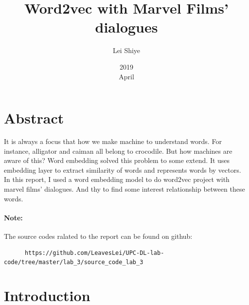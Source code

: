 \documentclass[a4paper,10pt]{article}
\begin{document}
%
   \title{Word2vec with Marvel Films' dialogues}

   \author{Lei Shiye}
          
   \date{2019\\ April}

   \maketitle
 
  \newpage
    
\section*{Abstract}
It is always a focus that how we make machine to understand words. For instance, alligator and caiman all belong to crocodile. But how machines are aware of this? Word embedding solved this problem to some extend. It uses embedding layer to extract similarity of words and represents words by vectors.
In this report, I used a word embedding model to do word2vec project with marvel films' dialogues. And thy to find some interest relationship between these words.

\paragraph{Note:}
The source codes ralated to the report can be found on github:
\begin{verbatim} 
      https://github.com/LeavesLei/UPC-DL-lab-code/tree/master/lab_3/source_code_lab_3
\end{verbatim}

\section{Introduction}
\end{document}
